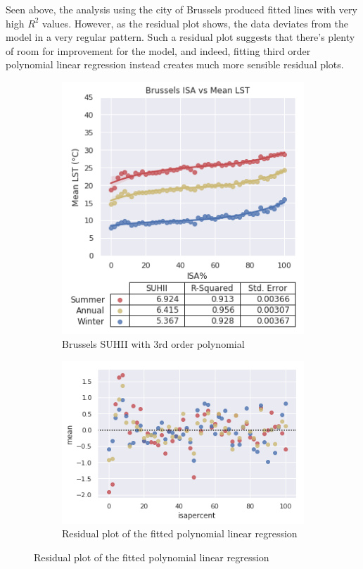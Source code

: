 \documentclass{article}
\begin{document}
Seen above, the analysis using the city of Brussels produced fitted lines with very high $R^2$ values. However, as the residual plot shows, the data deviates from the model in a very regular pattern. Such a residual plot suggests that there's plenty of room for improvement for the model, and indeed, fitting third order polynomial linear regression instead creates much more sensible residual plots.

\begin{figure}[!htb]
    \begin{subfigure}{0.36\textwidth}
        \centering
        \includegraphics[width=1\linewidth]{Brussels3.png}
        \caption{Brussels SUHII with 3rd order polynomial}
        \label{fig:subim6}
    \end{subfigure}
    \begin{subfigure}{0.6\textwidth}
        \centering
        \includegraphics[width=1\linewidth]{Brussels3Resid.png}
        \caption{Residual plot of the fitted polynomial linear regression}
        \label{fig:subim7}
    \end{subfigure}
    
\end{figure}
\end{document}

